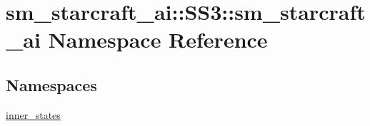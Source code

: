 \hypertarget{namespacesm__starcraft__ai_1_1SS3_1_1sm__starcraft__ai}{}\section{sm\+\_\+starcraft\+\_\+ai\+:\+:S\+S3\+:\+:sm\+\_\+starcraft\+\_\+ai Namespace Reference}
\label{namespacesm__starcraft__ai_1_1SS3_1_1sm__starcraft__ai}
\subsection*{Namespaces}
\begin{DoxyCompactItemize}
\item 
 \hyperlink{namespacesm__starcraft__ai_1_1SS3_1_1sm__starcraft__ai_1_1inner__states}{inner\+\_\+states}
\end{DoxyCompactItemize}
